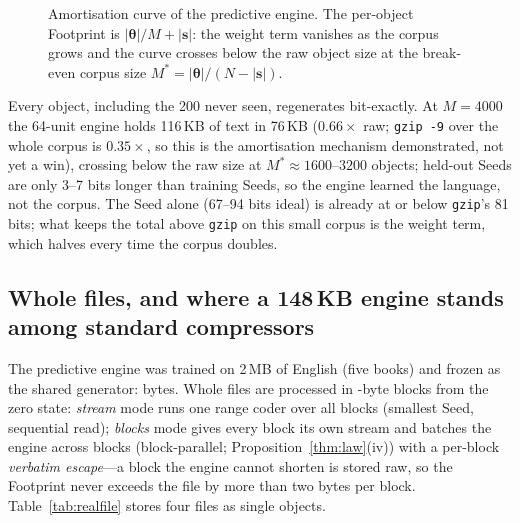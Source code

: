 \documentclass[11pt,a4paper]{article}
\theoremstyle{definition}
\theoremstyle{plain}
\theoremstyle{remark}
\newcommand{\seed}{\mathbf{s}}
\newcommand{\weights}{\bm{\theta}}
\begin{document}
\begin{figure}[!htb]
\centering
{}
\caption{Amortisation curve of the predictive engine. The per-object Footprint is $|\weights|/M+|\seed|$:
the weight term vanishes as the corpus grows and the curve crosses below the raw object size
at the break-even corpus size $M^{*}=|\weights|/(N-|\seed|)$.}
\label{fig:amort}
\end{figure}

Every object, including the 200 never seen, regenerates bit-exactly. At $M=4000$ the 64-unit
engine holds 116\,KB of text in 76\,KB ($0.66\times$ raw; \texttt{gzip -9} over the whole corpus
is $0.35\times$, so this is the amortisation mechanism demonstrated, not yet a win), crossing
below the raw size at $M^{*}\approx1600$--$3200$ objects; held-out Seeds are only 3--7 bits longer than training Seeds,
so the engine learned the language, not the corpus. The Seed alone (67--94 bits ideal) is already
at or below \texttt{gzip}'s 81 bits; what keeps the total above \texttt{gzip} on this small corpus
is the weight term, which halves every time the corpus doubles.

\subsection{Whole files, and where a 148\,KB engine stands among standard compressors}
\label{sec:realfile}
The predictive engine was trained on 2\,MB of English (five books) and frozen as the shared
generator: \engineBytes{} bytes. Whole files are processed in \blockLen{}-byte blocks from the
zero state: \emph{stream} mode runs one range coder over all blocks (smallest Seed, sequential
read); \emph{blocks} mode gives every block its own stream and batches the engine across blocks
(block-parallel; Proposition~\ref{thm:law}(iv)) with a per-block \emph{verbatim escape}---a block
the engine cannot shorten is stored raw, so the Footprint never exceeds the file by more than two
bytes per block. Table~\ref{tab:realfile} stores four files as single objects.
\end{document}
